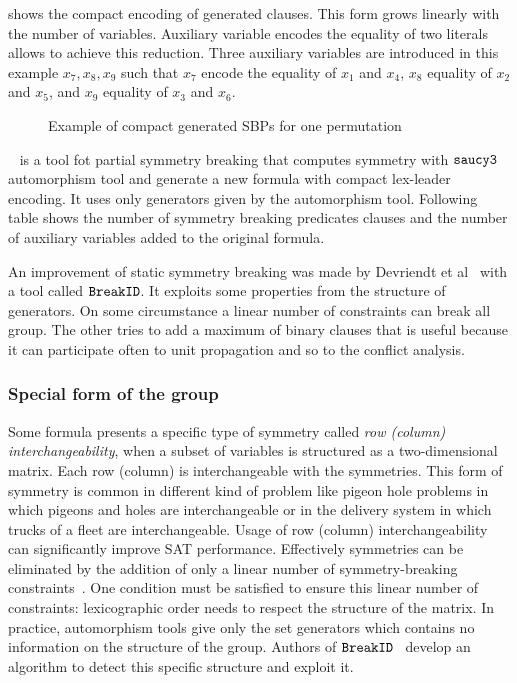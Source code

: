  shows the compact encoding of generated clauses. This form grows linearly with the number of variables.
Auxiliary variable encodes the equality of two literals allows to achieve this reduction. Three auxiliary variables are introduced
in this example $x_7, x_8, x_9$ such that $x_7$ encode the equality of $x_1$ and $x_4$, $x_8$ equality of $x_2$ and $x_5$, and $x_9$ equality of $x_3$ and $x_6$.

 \begin{figure}[!htbp]
 
 \caption{Example of compact generated SBPs for one permutation}
 \label{fig:esbp_compact_gen}
\end{figure}

\shatter~\cite{aloul06} is a tool fot partial symmetry breaking that computes symmetry with $\texttt{saucy3}$ automorphism tool and generate a new formula with compact lex-leader encoding. It uses only generators given by the automorphism tool. Following table shows the number of symmetry breaking predicates clauses and the
number of auxiliary variables added to the original formula.



%

An improvement of static symmetry breaking was made by Devriendt et al~\cite{devriendt2016improved} with a tool 
called $\texttt{BreakID}$. It exploits some properties from the structure of generators. On some circumstance 
a linear number of constraints can break all group. The other tries to add a maximum of binary clauses that 
is useful because it can participate often to unit propagation and so to the conflict analysis.

\subsubsection{Special form of the group} \label{sec:matrix-sbp}
Some formula presents a specific type of symmetry called \emph{row (column) interchangeability}, when a
subset of variables is structured as a two-dimensional matrix. Each row (column) is interchangeable
with the symmetries. 
This form of symmetry is common in different kind of problem like pigeon hole problems in which
pigeons and holes are interchangeable or in the delivery system in which trucks of a fleet are interchangeable.
Usage of row (column) interchangeability can significantly improve SAT performance. 
Effectively symmetries can be eliminated by the addition 
of only a linear number of symmetry-breaking constraints~\cite{flener2002breaking}. 
One condition must be satisfied to ensure this linear number of constraints:
lexicographic order needs to respect the structure of the matrix.
In practice, automorphism tools give only the set generators which contains no information on
the structure of the group. 
Authors of $\texttt{BreakID}$~\cite{devriendt2016improved} develop an algorithm to detect this specific 
structure and exploit it.

